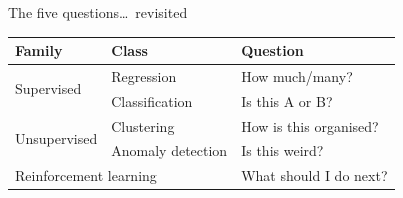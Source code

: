 \begin{frame}{The five questions\ldots~revisited}
    \begin{center}
        \begin{tabular}{lll}
            \toprule
            \textbf{Family}               & \textbf{Class}         & \textbf{Question} \\
            \midrule
            \multirow{2}{*}{Supervised}   & Regression             & How much/many? \\
                                          & Classification         & Is this A or B? \\
            \midrule
            \multirow{2}{*}{Unsupervised} & Clustering             & How is this organised? \\
                                          & Anomaly detection      & Is this weird? \\
            \midrule
            \multicolumn{2}{l}{Reinforcement learning}             & What should I do next? \\
            \bottomrule
        \end{tabular}
    \end{center}
\end{frame}



